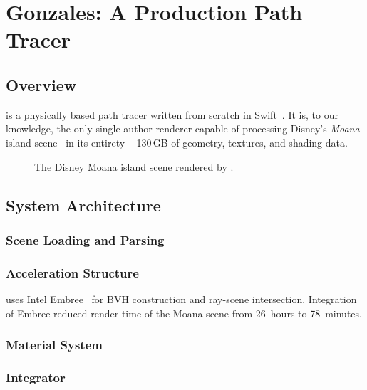 \chapter{Gonzales: A Production Path Tracer}
\label{chap:gonzales}

\section{Overview}

\gonzales{} is a physically based path tracer written from scratch in Swift~\cite{Wendleder2024Gonzales}.
It is, to our knowledge, the only single-author renderer capable of
processing Disney's \emph{Moana} island scene~\cite{Disney2018Moana}
in its entirety -- 130\,GB of geometry, textures, and shading data.

\begin{figure}[h]
  \centering
  \caption{The Disney Moana island scene rendered by \gonzales{}.}
  \label{fig:moana}
\end{figure}

\section{System Architecture}

\subsection{Scene Loading and Parsing}


\subsection{Acceleration Structure}

\gonzales{} uses Intel Embree~\cite{Wald2014Embree} for BVH construction
and ray-scene intersection.
Integration of Embree reduced render time of the Moana scene from
26~hours to 78~minutes.

\subsection{Material System}


\subsection{Integrator}

